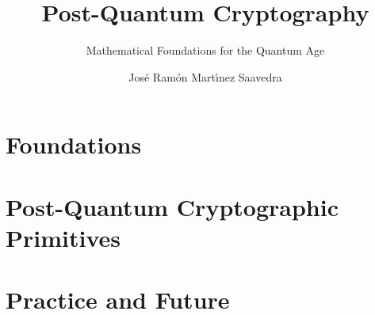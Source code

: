 \documentclass[graybox,envcountchap,sectrefs]{SNmono}
\begin{document}
\author{Jos\'{e} Ram\'{o}n Mart\'{\i}nez Saavedra}
\title{Post-Quantum Cryptography}
\subtitle{Mathematical Foundations for the Quantum Age}
\maketitle

\frontmatter%



\tableofcontents



\mainmatter%


\part{Foundations}
\label{part:foundations}







\part{Post-Quantum Cryptographic Primitives}
\label{part:primitives}










\part{Practice and Future}
\label{part:practice}
\end{document}

